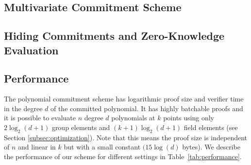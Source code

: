 \subsection{Multivariate Commitment Scheme}
\label{sec:multivariate}



\subsection{Hiding Commitments and Zero-Knowledge Evaluation}
\label{section:zeroknowlege}


\subsection{Performance}
The polynomial commitment scheme has logarithmic proof size and verifier time in the degree $d$ of the committed polynomial. 
It has highly batchable proofs and it is possible to evaluate $n$ degree $d$ polynomials at $k$ points using only $2\log_2(d+1)$ group elements and $(k+1)\log_2(d+1)$ field elements (see Section \ref{subsec:optimization}). Note that this means the proof size is independent of $n$ and linear in $k$ but with a small constant $(15 \log(d)$ bytes). 
We describe the performance of our scheme for different settings in Table~\ref{tab:performance}.

